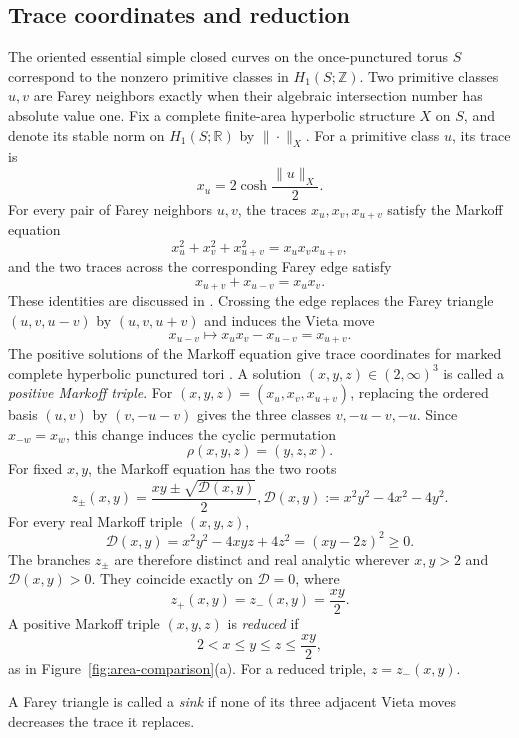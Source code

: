 \documentclass[10pt,twoside]{article}
\theoremstyle{plain}
\theoremstyle{definition}
\theoremstyle{remark}
\newcommand{\R}{\mathbb R}
\newcommand{\Z}{\mathbb Z}
\begin{document}
\subsection{Trace coordinates and reduction}
The oriented essential simple closed curves on the once-punctured torus
$S$ correspond to the nonzero primitive classes in $H_1(S;\Z)$.
Two primitive classes $u,v$ are Farey neighbors exactly when their
algebraic intersection number has absolute value one. Fix a complete
finite-area hyperbolic structure $X$ on $S$, and denote its stable norm on
$H_1(S;\R)$ by $\|\cdot\|_X$. For a primitive class $u$, its trace is
$$
x_u=2\cosh\frac{\|u\|_X}{2}.
$$
For every pair of Farey neighbors $u,v$, the traces
$x_u,x_v,x_{u+v}$ satisfy the Markoff equation
\begin{equation}
\label{eq:markoff}
x_u^2+x_v^2+x_{u+v}^2=x_ux_vx_{u+v},
\end{equation}
and the two traces across the corresponding Farey edge satisfy
\begin{equation}
\label{eq:vieta}
x_{u+v}+x_{u-v}=x_ux_v.
\end{equation}
These identities are discussed in \cite{Bowditch}. Crossing the edge
replaces the Farey triangle
$(u,v,u-v)$ by $(u,v,u+v)$ and induces the Vieta move
$$
x_{u-v}\longmapsto x_ux_v-x_{u-v}=x_{u+v}.
$$
The positive solutions of the Markoff equation give trace coordinates
for marked complete hyperbolic punctured tori
\cite[Theorem~4.1.2 and Section~4.4]{GoldmanTrace}. A solution
$(x,y,z)\in(2,\infty)^3$ is called a \emph{positive Markoff triple}.
For $(x,y,z)=(x_u,x_v,x_{u+v})$, replacing the ordered basis
$(u,v)$ by $(v,-u-v)$ gives the three classes $v,-u-v,-u$.
Since $x_{-w}=x_w$, this change induces the cyclic permutation
\begin{equation}
\label{eq:cyclic-trace-permutation}
\rho(x,y,z)=(y,z,x).
\end{equation}
For fixed $x,y$, the Markoff equation has the two roots
$$
z_\pm(x,y)
=
\frac{xy\pm\sqrt{\mathscr D(x,y)}}2,
\mathscr D(x,y):=x^2y^2-4x^2-4y^2.
$$
For every real Markoff triple $(x,y,z)$,
$$
\mathscr D(x,y)
=
x^2y^2-4xyz+4z^2
=
(xy-2z)^2
\geq0.
$$
The branches $z_\pm$ are therefore distinct and real analytic wherever
$x,y>2$ and $\mathscr D(x,y)>0$. They coincide exactly on
$\mathscr D=0$, where
$$
z_+(x,y)=z_-(x,y)=\frac{xy}{2}.
$$
A positive Markoff triple $(x,y,z)$ is \emph{reduced} if
$$2<x\leq y\leq z\leq\frac{xy}{2},$$
as in Figure~\ref{fig:area-comparison}(a). For a reduced triple,
$
z=z_-(x,y).
$

A Farey triangle is called a \emph{sink} if none of its three
adjacent Vieta moves decreases the trace it replaces.
\end{document}
